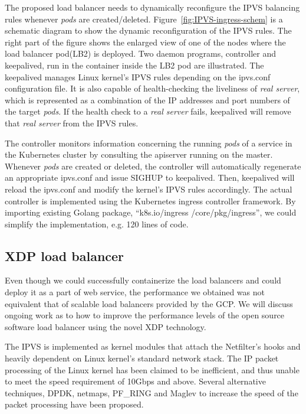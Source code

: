 The proposed load balancer needs to dynamically reconfigure the IPVS balancing rules whenever {\em pods} are created/deleted. 
Figure~\ref{fig:IPVS-ingress-schem} is a schematic diagram to show the dynamic reconfiguration of the IPVS rules.
The right part of the figure shows the enlarged view of one of the nodes where the load balancer pod(LB2) is deployed.
Two daemon programs, controller and keepalived, run in the container inside the LB2 pod are illustrated.
The keepalived manages Linux kernel's IPVS rules depending on the ipvs.conf configuration file.
It is also capable of health-checking the liveliness of {\em real server}, 
which is represented as a combination of the IP addresses and port numbers of the target {\em pods}. 
If the health check to a {\em real server} fails, keepalived will remove that {\em real server} from the IPVS rules.

The controller monitors information concerning the running {\em pods} of a service 
in the Kubernetes cluster by consulting the apiserver running on the master.
Whenever {\em pods} are created or deleted, the controller will automatically regenerate an appropriate ipvs.conf 
and issue SIGHUP to keepalived.
Then, keepalived will reload the ipvs.conf and modify the kernel's IPVS rules accordingly.
The actual controller\cite{ktaka_ccmp_2017_826894} is implemented using the Kubernetes ingress controller\cite{K8sIngress2017} framework. 
By importing existing Golang package, \enquote{k8s.io/ingress /core/pkg/ingress}, we could simplify the implementation, e.g. 
120 lines of code.  

\subsection{XDP load balancer}\label{XDP loadbalancer}
Even though we could successfully containerize the load balancers and could deploy it as a part of web service,
the performance we obtained was not equivalent that of scalable load balancers provided by the GCP.
We will discuss ongoing work as to how to improve the performance levels of the open source software load balancer using the novel XDP technology.

The IPVS is implemented as kernel modules that attach the Netfilter's\cite{hubert2002linux} hooks and heavily dependent on Linux kernel's standard network stack.
The IP packet processing of the Linux kernel has been claimed to be inefficient, and thus unable to meet the speed requirement of 10Gbps and above.
Several alternative techniques, DPDK\cite{dpdkorg}, netmaps\cite{rizzo2012netmap}, PF\_RING\cite{deri2004improving} and Maglev\cite{eisenbud2016maglev} to increase the speed of the packet processing have been proposed.

